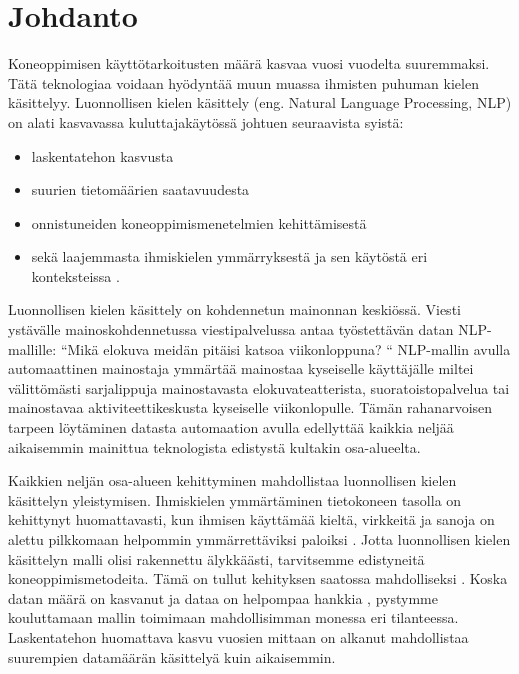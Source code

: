 \chapter{Johdanto\label{intro}}

Koneoppimisen käyttötarkoitusten määrä kasvaa vuosi vuodelta suuremmaksi. Tätä teknologiaa voidaan hyödyntää muun muassa ihmisten puhuman kielen käsittelyy. Luonnollisen kielen käsittely (eng. Natural Language Processing, NLP) on alati kasvavassa kuluttajakäytössä johtuen seuraavista syistä:
\begin{itemize}
  \item laskentatehon kasvusta
  \item suurien tietomäärien saatavuudesta
  \item onnistuneiden koneoppimismenetelmien kehittämisestä
  \item sekä laajemmasta ihmiskielen ymmärryksestä ja sen käytöstä eri\\ konteksteissa \citep{doi:10.1126/science.aaa8685}.
\end{itemize}

Luonnollisen kielen käsittely on kohdennetun mainonnan keskiössä. Viesti ystävälle mainoskohdennetussa viestipalvelussa antaa työstettävän datan NLP-mallille: ``Mikä elokuva meidän pitäisi katsoa viikonloppuna? `` NLP-mallin avulla automaattinen mainostaja ymmärtää mainostaa kyseiselle käyttäjälle miltei välittömästi sarjalippuja mainostavasta elokuvateatterista, suoratoistopalvelua tai mainostavaa aktiviteettikeskusta kyseiselle viikonlopulle. Tämän rahanarvoisen tarpeen löytäminen datasta automaation avulla edellyttää kaikkia neljää aikaisemmin mainittua teknologista edistystä kultakin osa-alueelta.

Kaikkien neljän osa-alueen kehittyminen mahdollistaa luonnollisen kielen käsittelyn yleistymisen. Ihmiskielen ymmärtäminen tietokoneen tasolla on kehittynyt huomattavasti, kun ihmisen käyttämää kieltä, virkkeitä ja sanoja on alettu pilkkomaan helpommin ymmärrettäviksi paloiksi \citep{https://doi.org/10.1002/aris.1440370103}. Jotta luonnollisen kielen käsittelyn malli olisi rakennettu älykkäästi, tarvitsemme edistyneitä koneoppimismetodeita. Tämä on tullut kehityksen saatossa mahdolliseksi \citep{jordan2015machine}. Koska datan määrä on kasvanut ja dataa on helpompaa hankkia \citep{gopalakrishnan2018deep}, pystymme kouluttamaan mallin toimimaan mahdollisimman monessa eri tilanteessa. Laskentatehon huomattava kasvu vuosien mittaan \citep{moore1965cramming} on alkanut mahdollistaa suurempien datamäärän käsittelyä kuin aikaisemmin.

